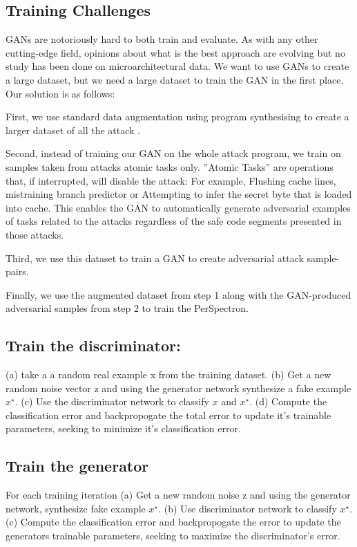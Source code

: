 \subsection{Training Challenges}
GANs are notoriously hard to both train and evaluate. As with any other cutting-edge field, opinions about what is the best approach are evolving but no study has been done on microarchitectural data. 
We want to use GANs to create a large dataset, but we need a large dataset to train the GAN in the first place. Our solution is as follows:

First, we use standard data augmentation using program synthesising to create a larger dataset of all the attack .

Second, instead of training our GAN on the whole attack program, we train on samples taken from attacks atomic tasks only.  ”Atomic
Tasks” are operations that, if interrupted, will disable the attack: For example, Flushing cache lines, mistraining branch predictor  or
Attempting to infer the secret byte that is loaded into cache.
This enables the GAN to automatically generate adversarial examples of tasks related to the attacks regardless of the safe code segments presented in those attacks. 

Third, we use this dataset to train a GAN to create adversarial attack sample-pairs. 

Finally, we use the augmented dataset from step 1 along with the GAN-produced adversarial samples from step 2 to train the PerSpectron. 

 



\subsection{Train the discriminator:}
(a) take a a random real example x from the training dataset. (b) Get a new random noise vector z and using the generator network synthesize a fake example  $x^{\star}$. (c) Use the discriminator network to classify  $x$ and  $x^{\star}$. (d) Compute the classification error and backpropogate the total error to update it's trainable parameters, seeking to minimize it's classification error. 

\subsection{Train the generator}
For each training iteration
(a) Get a new random noise z and using the generator network, synthesize fake example $x^{\star}$. (b) Use discriminator network to classify $x^{\star}$. (c) Compute the classification error and backpropogate the error to update the generators trainable parameters, seeking to maximize the discriminator's error. 

